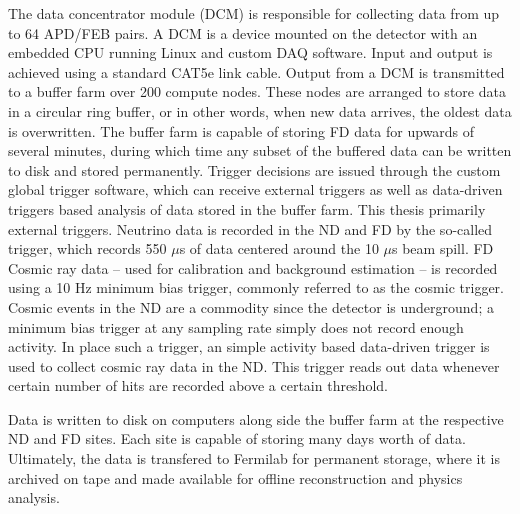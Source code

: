 The \nova data concentrator module (DCM) is responsible for collecting data from up to 64 APD/FEB pairs.   A DCM is a device mounted on the detector with an embedded CPU running Linux and custom \nova DAQ software.  Input and output is achieved using a standard CAT5e link cable.  Output from a DCM is transmitted to a buffer farm over 200 compute nodes.  These nodes are arranged to store data in a circular ring buffer, or in other words, when new data arrives, the oldest data is overwritten.  The buffer farm is capable of storing FD data for upwards of several minutes, during which time any subset of the buffered data can be written to disk and stored permanently.  Trigger decisions are issued through the custom \nova global trigger software, which can receive external triggers as well as data-driven triggers based analysis of data stored in the buffer farm.  This thesis primarily external triggers.  Neutrino data is recorded in the ND and FD by the so-called \numi trigger, which records 550 $\mu$s of data centered around the 10 $\mu$s \numi beam spill.  FD Cosmic ray data -- used for calibration and background estimation -- is recorded using a 10 Hz minimum bias trigger, commonly referred to as the cosmic trigger.   Cosmic events in the ND are a commodity since the detector is underground; a minimum bias trigger at any sampling rate simply does not record enough activity.  In place such a trigger, an simple activity based data-driven trigger is used to collect cosmic ray data in the ND.  This trigger reads out data whenever certain number of hits are recorded above a certain threshold.

Data is written to disk on computers along side the buffer farm at the respective ND and FD sites.  Each site is capable of storing many days worth of data.  Ultimately, the data is transfered to Fermilab for permanent storage, where it is archived on tape and made available for offline reconstruction and physics analysis.


